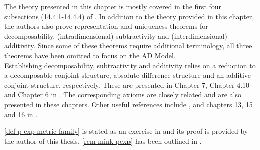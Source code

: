 \begin{sourcescontribs}
The theory presented in this chapter is mostly covered in the first four subsections (14.4.1-14.4.4) of \textcite[Chapter 14.4, pp. 175-185]{foundations2}. In addition to the theory provided in this chapter, the authors also prove representation and uniqueness theorems for decomposability, (intradimensional) subtractivity and (interdimensional) additivity. Since some of these theorems require additional terminology, all three theorems have been omitted to focus on the AD Model.\\
Establishing decomposability, subtractivity and additivity relies on a reduction to a decomposable conjoint structure, absolute difference structure and an additive conjoint structure, respectively. These are presented in Chapter 7, Chapter 4.10 and Chapter 6 in \textcite{foundations1}. The corresponding axioms are closely related and are also presented in these chapters.
Other useful references include \textcite{foundationsMDS}, \textcite{tversky1970dimensional} and chapters 13, 15 and 16 in \textcite{TheorieDesMessens}.

\cref{def-p-exp-metric-family} is stated as an exercise in \textcite[p. 79, Exercise 19]{foundations2} and its proof is provided by the author of this thesis. \cref{rem-mink-pexp} has been outlined in \textcite[p. 73]{foundations2}.
\end{sourcescontribs}
